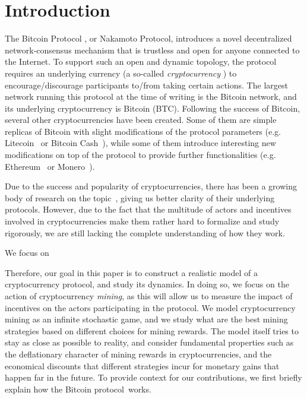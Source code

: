 
\section{Introduction}

The Bitcoin Protocol \cite{Bitcoin,DBLP:books/daglib/0040621,NC17}, or Nakamoto Protocol, introduces a novel decentralized network-consensus mechanism that is trustless and open for anyone connected to the Internet. To support such an open and dynamic topology, the protocol requires an underlying currency (a so-called \emph{cryptocurrency} \cite{NC17}) to encourage/discourage participants to/from taking certain actions. The largest network running this protocol at the time of writing is the Bitcoin network, and its underlying cryptocurrency is Bitcoin (BTC). Following the success of Bitcoin, several other cryptocurrencies have been created. Some of them are simple replicas of Bitcoin with slight modifications of the protocol parameters (e.g. Litecoin~\cite{Litecoin} or Bitcoin Cash~\cite{Bcash}), while some of them introduce interesting new modifications on top of the protocol to provide further functionalities (e.g. Ethereum~\cite{Ethereum,E17} or Monero~\cite{Monero}).

Due to the success and popularity of cryptocurrencies, there has been a growing body of research on the topic~\cite{mininggames:2016,optimalselfishmining2017,instabilitywithoutreward:2016,selfishmining2014,stop_selfish_mining2014,eclipseattacks2015,LBSZR15,LJG15,stubborn_mining:2016,economics_of_mining2013,ZGR17,ABLZ17,MHG18,SZWTK18}, giving us better clarity of their underlying protocols. However, due to the fact that the multitude of actors and incentives involved in cryptocurrencies make them rather hard to formalize and study rigorously, we are still lacking the complete understanding of how they work. 

We focus on 






Therefore, our goal in this paper is to construct a realistic model of a cryptocurrency protocol, and study its dynamics. In doing so, we focus on the action of cryptocurrency \emph{mining}, as this will allow us to measure the impact of incentives on the actors participating in the protocol. We model cryptocurrency mining as an infinite stochastic game, and we study what are the best mining strategies based on different choices for mining rewards. The model itself tries to stay as close as possible to reality, and consider 
fundamental properties such as the deflationary character of mining rewards in cryptocurrencies, and the economical discounts that different strategies incur for monetary gains that happen far in the future.
To provide context for our contributions, we first briefly explain how the Bitcoin protocol~works.


